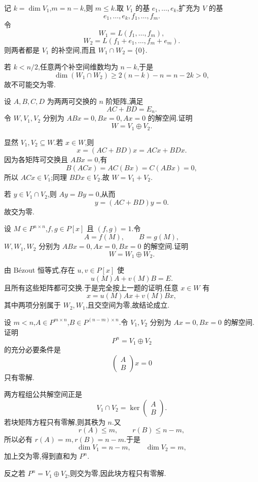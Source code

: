 \begin{solution}
记 $k=\dim V_1$,$m=n-k$,则 $m\leq k$.取 $V_1$ 的基 $e_1,\ldots,e_k$,扩充为 $V$ 的基
\[
e_1,\ldots,e_k,f_1,\ldots,f_m.
\]
令
\[
W_1=L(f_1,\ldots,f_m),
\]
\[
W_2=L(f_1+e_1,\ldots,f_m+e_m).
\]
则两者都是 $V_1$ 的补空间,而且 $W_1\cap W_2=\{0\}$.

若 $k<n/2$,任意两个补空间维数均为 $n-k$,于是
\[
\dim(W_1\cap W_2)\geq2(n-k)-n=n-2k>0,
\]
故不可能交为零.
\end{solution}

\begin{example}
设 $A,B,C,D$ 为两两可交换的 $n$ 阶矩阵,满足
\[
AC+BD=E_n.
\]
令 $W,V_1,V_2$ 分别为 $ABx=0,Bx=0,Ax=0$ 的解空间.证明
\[
W=V_1\oplus V_2.
\]
\end{example}
\exampleblank

\begin{solution}
显然 $V_1,V_2\subseteq W$.若 $x\in W$,则
\[
x=(AC+BD)x=ACx+BDx.
\]
因为各矩阵可交换且 $ABx=0$,有
\[
B(ACx)=AC(Bx)=C(ABx)=0,
\]
所以 $ACx\in V_1$;同理 $BDx\in V_2$.故 $W=V_1+V_2$.

若 $y\in V_1\cap V_2$,则 $Ay=By=0$,从而
\[
y=(AC+BD)y=0.
\]
故交为零.
\end{solution}

\begin{example}[\markstar]
设 $M\in P^{n\times n}$,$f,g\in P[x]$ 且 $(f,g)=1$.令
\[
A=f(M),\qquad B=g(M),
\]
$W,W_1,W_2$ 分别为 $ABx=0,Ax=0,Bx=0$ 的解空间.证明
\[
W=W_1\oplus W_2.
\]
\end{example}
\exampleblank

\begin{solution}
由 Bézout 恒等式,存在 $u,v\in P[x]$ 使
\[
u(M)A+v(M)B=E.
\]
且所有这些矩阵都可交换.于是完全按上一题的证明,任意 $x\in W$ 有
\[
x=u(M)Ax+v(M)Bx,
\]
其中两项分别属于 $W_2,W_1$,且交空间为零,故结论成立.
\end{solution}

\begin{example}
设 $m<n$,$A\in P^{m\times n}$,$B\in P^{(n-m)\times n}$.令 $V_1,V_2$ 分别为 $Ax=0,Bx=0$ 的解空间.证明
\[
P^n=V_1\oplus V_2
\]
的充分必要条件是
\[
\begin{pmatrix}A\\B\end{pmatrix}x=0
\]
只有零解.
\end{example}
\exampleblank

\begin{solution}
两方程组公共解空间正是
\[
V_1\cap V_2
=\ker\begin{pmatrix}A\\B\end{pmatrix}.
\]
若块矩阵方程只有零解,则其秩为 $n$.又
\[
r(A)\leq m,\qquad r(B)\leq n-m,
\]
所以必有 $r(A)=m,r(B)=n-m$.于是
\[
\dim V_1=n-m,\qquad \dim V_2=m,
\]
加上交为零,得到直和为 $P^n$.

反之若 $P^n=V_1\oplus V_2$,则交为零,因此块方程只有零解.
\end{solution}


